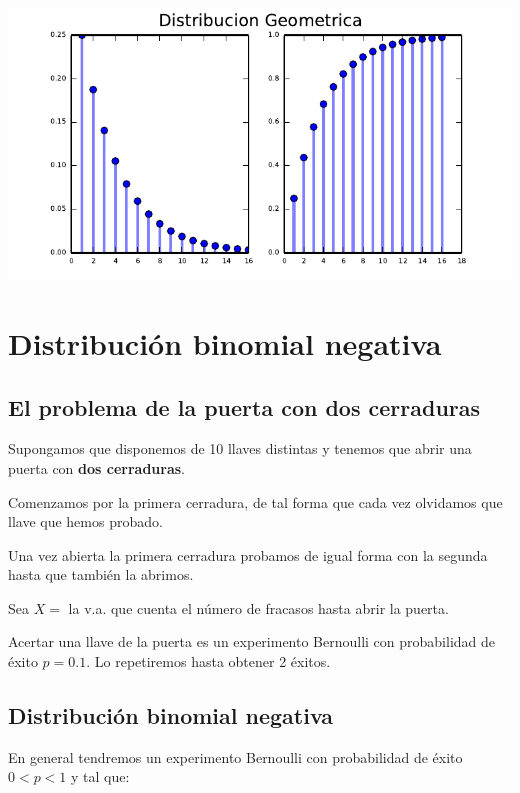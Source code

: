 \documentclass[]{book}
\begin{document}
\includegraphics{curso-probabilidad-udemy_files/figure-latex/unnamed-chunk-35-1.pdf}

\hypertarget{distribuciuxf3n-binomial-negativa}{%
\section{Distribución binomial negativa}\label{distribuciuxf3n-binomial-negativa}}

\hypertarget{el-problema-de-la-puerta-con-dos-cerraduras}{%
\subsection{El problema de la puerta con dos cerraduras}\label{el-problema-de-la-puerta-con-dos-cerraduras}}

Supongamos que disponemos de 10 llaves distintas y tenemos que abrir una puerta con \textbf{dos cerraduras}.

Comenzamos por la primera cerradura, de tal forma que cada vez olvidamos que llave que hemos probado.

Una vez abierta la primera cerradura probamos de igual forma con la segunda hasta que también la abrimos.

Sea \(X=\) la v.a. que cuenta el número de fracasos hasta abrir la puerta.

Acertar una llave de la puerta es un experimento Bernoulli con probabilidad de éxito \(p=0.1\). Lo repetiremos hasta obtener 2 éxitos.

\hypertarget{distribuciuxf3n-binomial-negativa-1}{%
\subsection{Distribución binomial negativa}\label{distribuciuxf3n-binomial-negativa-1}}

En general tendremos un experimento Bernoulli con probabilidad de éxito \(0<p<1\) y tal que:
\end{document}
